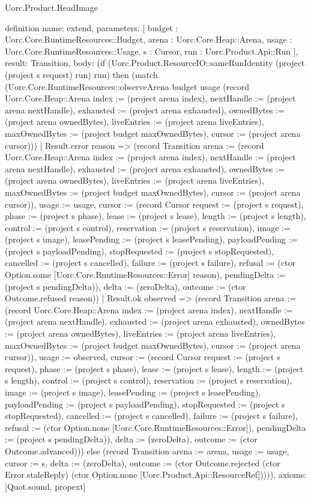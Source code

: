 \begin{lexlean}{Uorc.Product.ReadImage}
\begin{semanticmodule}
definition{
  name: extend,
  parameters: [
    budget : Uorc.Core.RuntimeResources::Budget,
    arena : Uorc.Core.Heap::Arena,
    usage : Uorc.Core.RuntimeResources::Usage,
    s : Cursor,
    run : Uorc.Product.Api::Run
  ],
  result: Transition,
  body: (if (Uorc.Product.ResourceIO::sameRunIdentity (project (project s request) run) run) then (match (Uorc.Core.RuntimeResources::observeArena budget usage (record Uorc.Core.Heap::Arena {index := (project arena index), nextHandle := (project arena nextHandle), exhausted := (project arena exhausted), ownedBytes := (project arena ownedBytes), liveEntries := (project arena liveEntries), maxOwnedBytes := (project budget maxOwnedBytes), cursor := (project arena cursor)}))
    | Result.error reason => (record Transition {arena := (record Uorc.Core.Heap::Arena {index := (project arena index), nextHandle := (project arena nextHandle), exhausted := (project arena exhausted), ownedBytes := (project arena ownedBytes), liveEntries := (project arena liveEntries), maxOwnedBytes := (project budget maxOwnedBytes), cursor := (project arena cursor)}), usage := usage, cursor := (record Cursor {request := (project s request), phase := (project s phase), lease := (project s lease), length := (project s length), control := (project s control), reservation := (project s reservation), image := (project s image), leasePending := (project s leasePending), payloadPending := (project s payloadPending), stopRequested := (project s stopRequested), cancelled := (project s cancelled), failure := (project s failure), refusal := (ctor Option.some [Uorc.Core.RuntimeResources::Error] reason), pendingDelta := (project s pendingDelta)}), delta := (zeroDelta), outcome := (ctor Outcome.refused reason)})
    | Result.ok observed => (record Transition {arena := (record Uorc.Core.Heap::Arena {index := (project arena index), nextHandle := (project arena nextHandle), exhausted := (project arena exhausted), ownedBytes := (project arena ownedBytes), liveEntries := (project arena liveEntries), maxOwnedBytes := (project budget maxOwnedBytes), cursor := (project arena cursor)}), usage := observed, cursor := (record Cursor {request := (project s request), phase := (project s phase), lease := (project s lease), length := (project s length), control := (project s control), reservation := (project s reservation), image := (project s image), leasePending := (project s leasePending), payloadPending := (project s payloadPending), stopRequested := (project s stopRequested), cancelled := (project s cancelled), failure := (project s failure), refusal := (ctor Option.none [Uorc.Core.RuntimeResources::Error]), pendingDelta := (project s pendingDelta)}), delta := (zeroDelta), outcome := (ctor Outcome.advanced)})) else (record Transition {arena := arena, usage := usage, cursor := s, delta := (zeroDelta), outcome := (ctor Outcome.rejected (ctor Error.staleReply) (ctor Option.none [Uorc.Product.Api::ResourceRef]))})),
  axioms: [Quot.sound, propext]
}


\end{semanticmodule}
\end{lexlean}
